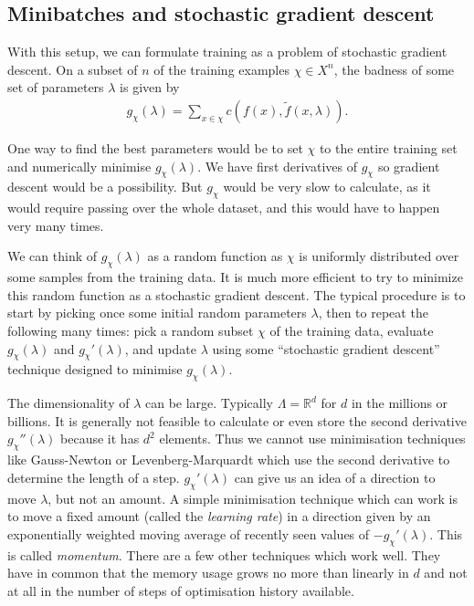 \subsection{Minibatches and stochastic gradient descent}
\label{sec:minibatchesSGD}
With this setup, we can formulate training as a problem of stochastic gradient descent.
On a subset of $n$ of the training examples $\chi\in X^n$, the badness of some set of parameters $\lambda$ is given by 
\begin{align}
g_\chi(\lambda)=\sum_{x\in\chi}c(f(x),\tilde f(x,\lambda)).
\end{align}

One way to find the best parameters would be to set $\chi$ to the entire training set and numerically minimise $g_\chi(\lambda)$. We have first derivatives of $g_\chi$ so gradient descent would be a possibility. But $g_\chi$ would be very slow to calculate, as it would require passing over the whole dataset, and this would have to happen very many times.

We can think of $g_\chi(\lambda)$ as a random function as $\chi$ is uniformly distributed over some samples from the training data.
It is much more efficient to try to minimize this random function as a stochastic gradient descent. The typical procedure is to start by picking once some initial random parameters $\lambda$, then to repeat the following many times: pick a random subset $\chi$ of the training data, evaluate $g_\chi(\lambda)$ and $g_\chi'(\lambda)$, and update $\lambda$ using some ``stochastic gradient descent'' technique designed to minimise $g_\chi(\lambda)$.

The dimensionality of $\lambda$ can be large. Typically $\Lambda=\mathbb{R}^d$ for $d$ in the millions or billions.
It is generally not feasible to calculate or even store the second derivative 
$g_\chi''(\lambda)$ because it has $d^2$ elements.
Thus we cannot use minimisation techniques like Gauss-Newton or Levenberg-Marquardt which use the second derivative to determine the length of a step. $g_\chi'(\lambda)$ can give us an idea of a direction to move $\lambda$, but not an amount.
A simple minimisation technique which can work is to move a fixed amount (called the \emph{learning rate}) in a direction given by an exponentially weighted moving average of recently seen values of $-g_\chi'(\lambda)$.
This is called \emph{momentum}. There are a few other techniques which work well.
They have in common that the memory usage grows no more than linearly in $d$ and not at all in the number of steps of optimisation history available. 

